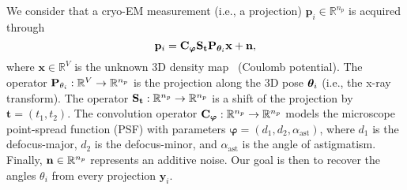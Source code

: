 We consider that a cryo-EM measurement (i.e., a projection) $\mathbf{p}_i \in \mathbb{R}^{n_p}$ is acquired through
\begin{equation*}
    \label{eqn:projection-eqn}
    \mathbf{p}_i = \mathbf{C}_{\boldsymbol\varphi} \mathbf{S}_{\mathbf{t}} \mathbf{P}_{{\boldsymbol{\theta}}_i} \mathbf{x} + \mathbf{n},
\end{equation*}
where $\mathbf x \in \mathbb{R}^{V}$ is the unknown 3D density map~\cite{dimaio_creating_2007} (Coulomb potential).
The operator $\mathbf{P}_{\theta_i}: \mathbb{R}^V \to \mathbb{R}^{n_p}$ is the projection along the 3D pose ${\boldsymbol{\theta}}_i$ (i.e., the x-ray transform).
The operator $\mathbf{S}_\mathbf{t}: \mathbb{R}^{n_p} \to \mathbb{R}^{n_p}$ is a shift of the projection by $\mathbf{t} = (t_1, t_2)$.
The convolution operator $\mathbf{C}_{\boldsymbol\varphi}: \mathbb{R}^{n_p} \to \mathbb{R}^{n_p}$ models the microscope point-spread function (PSF) with parameters $\boldsymbol\varphi = (d_1, d_2, \alpha_\mathrm{ast})$, where $d_1$ is the defocus-major, $d_2$ is the defocus-minor, and $\alpha_\mathrm{ast}$ is the angle of astigmatism.
Finally, $\mathbf{n} \in \mathbb{R}^{n_p}$ represents an additive noise. Our goal is then to recover the angles $\theta_i$ from every projection $\mathbf{y}_i$.

